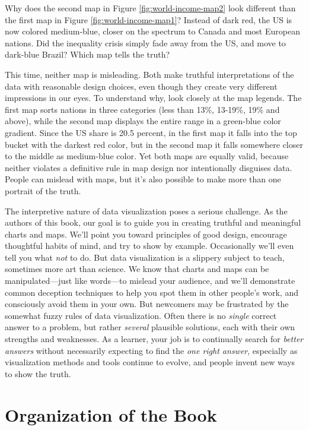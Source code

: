 \documentclass[
  english,
]{book}
\begin{document}
Why does the second map in Figure \ref{fig:world-income-map2} look different than the first map in Figure \ref{fig:world-income-map1}? Instead of dark red, the US is now colored medium-blue, closer on the spectrum to Canada and most European nations. Did the inequality crisis simply fade away from the US, and move to dark-blue Brazil? Which map tells the truth?

This time, neither map is misleading. Both make truthful interpretations of the data with reasonable design choices, even though they create very different impressions in our eyes. To understand why, look closely at the map legends. The first map sorts nations in three categories (less than 13\%, 13-19\%, 19\% and above), while the second map displays the entire range in a green-blue color gradient. Since the US share is 20.5 percent, in the first map it falls into the top bucket with the darkest red color, but in the second map it falls somewhere closer to the middle as medium-blue color. Yet both maps are equally valid, because neither violates a definitive rule in map design nor intentionally disguises data. People can mislead with maps, but it's also possible to make more than one portrait of the truth.

The interpretive nature of data visualization poses a serious challenge. As the authors of this book, our goal is to guide you in creating truthful and meaningful charts and maps. We'll point you toward principles of good design, encourage thoughtful habits of mind, and try to show by example. Occasionally we'll even tell you what \emph{not} to do. But data visualization is a slippery subject to teach, sometimes more art than science. We know that charts and maps can be manipulated---just like words---to mislead your audience, and we'll demonstrate common deception techniques to help you spot them in other people's work, and consciously avoid them in your own. But newcomers may be frustrated by the somewhat fuzzy rules of data visualization. Often there is no \emph{single} correct answer to a problem, but rather \emph{several} plausible solutions, each with their own strengths and weaknesses. As a learner, your job is to continually search for \emph{better answers} without necessarily expecting to find the \emph{one right answer}, especially as visualization methods and tools continue to evolve, and people invent new ways to show the truth.

\hypertarget{organization}{%
\section*{Organization of the Book}\label{organization}}
\end{document}
